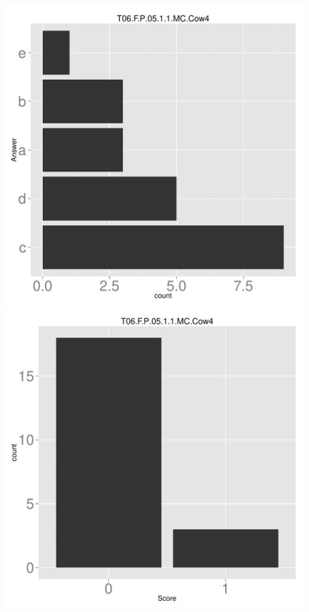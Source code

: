 \documentclass[12pt,nohyper]{tufte-handout}\usepackage[]{graphicx}\usepackage[]{color}
\begin{document}
\begin{center} \includegraphics[width=.45\linewidth]{Topic06_64_answer} \includegraphics[width=.45\linewidth]{Topic06_64_score} \end{center} 
\end{document}
